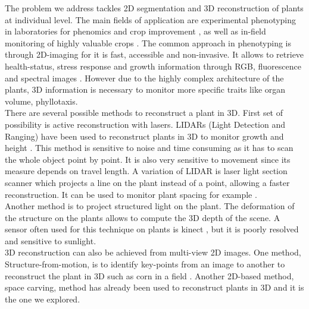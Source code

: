 
The problem we address tackles 2D segmentation and 3D reconstruction of plants at individual level. The main fields of application  are experimental phenotyping in laboratories for phenomics and crop improvement \cite{tisne_phenoscope:_2013,perez-sanz_plant_2017}, as well as in-field monitoring of highly valuable crops \cite{hoffmann_fluorescence_2015, fiorani_future_2013}. The common approach in phenotyping is through 2D-imaging for it is fast, accessible and non-invasive. It allows to retrieve health-status, stress response and growth information through RGB, fluorescence and spectral images \cite{li_review_2014}. However due to the highly complex architecture of the plants, 3D information is necessary to monitor more specific traits like organ volume, phyllotaxis. \\
There are several possible methods to reconstruct a plant in 3D. First set of possibility is active reconstruction with lasers. LIDARs (Light Detection and Ranging) have been used to reconstruct plants in 3D to monitor growth and height \cite{garrido_3d_2015}. This method is sensitive to noise and time consuming as it has to scan the whole object point by point. It is also very sensitive to movement since its measure depends on travel length. A variation of LIDAR is laser light section scanner which projects a line on the plant instead of a point, allowing a faster reconstruction. It can be used to monitor plant spacing for example \cite{shi_automatic_2013}. \\
Another method is to project structured light on the plant. The deformation of the structure on the plants allows to compute the 3D depth of the scene. A sensor often used for this technique on plants is kinect \cite{paulus_low-cost_2014, nguyen_structured_2015}, but it is poorly resolved and sensitive to sunlight.\\
3D reconstruction can also be achieved from multi-view 2D images. One method, Structure-from-motion, is to identify key-points from an image to another to reconstruct the plant in 3D such as corn in a field \cite{sodhi_-field_2017}. Another 2D-based method, space carving, method \cite{kutulakos_theory_1999} has already been used to reconstruct plants in 3D \cite{schonberger_structure--motion_2016} and it is the one we explored.\\
